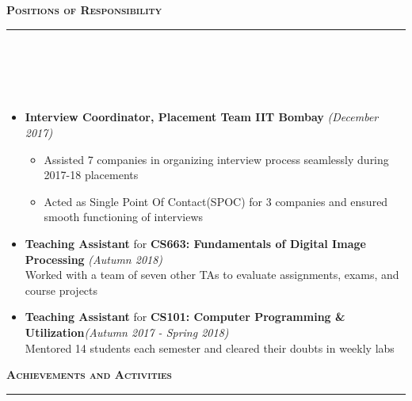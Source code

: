 \documentclass[a4paper,10pt]{article}
\newcommand{\lsep}{-0.5cm}
\newcommand{\resheading}[1]{{\small
        {
            \begin{minipage}
                {0.992\textwidth}\textbf{{\textsc{#1 \vphantom{p\^{E}} }}}
                \\[-0.3cm]
                \hrule
            \end{minipage}
            \\[-0.5cm]
        }
 }}
\begin{document}
\vspace{0.1cm}
\resheading{\textbf{\large Positions of Responsibility}}\\[\lsep] 
\\[-0.3cm]
\begin{itemize}
  \item \textbf{Interview Coordinator, Placement Team IIT Bombay} \hfill {\emph{(December 2017)}} \\[-0.6cm]
  \begin{itemize}
      \item Assisted 7 companies in organizing interview process seamlessly during 2017-18 placements
      \item Acted as Single Point Of Contact(SPOC) for 3 companies and ensured smooth functioning of interviews
  \end{itemize}
    \item \textbf{Teaching Assistant} for \textbf{ CS663: Fundamentals of Digital Image Processing} \hfill \emph{(Autumn 2018)}\\
    Worked with a team of seven other TAs to evaluate assignments, exams, and course projects
    \item \textbf{Teaching Assistant} for \textbf{CS101: Computer Programming \& Utilization}\hfill \emph{(Autumn 2017 - Spring 2018)}\\
    Mentored 14 students each semester and cleared their doubts in weekly labs 
\end{itemize}
\resheading{\textbf{\large Achievements and Activities}}\\[\lsep]
\end{document}
